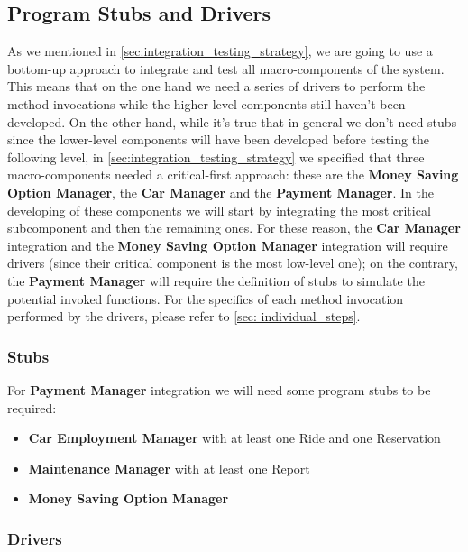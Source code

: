 	\subsection{Program Stubs and Drivers}
	
	As we mentioned in \autoref{sec:integration_testing_strategy}, we are going to use a bottom-up approach to integrate and test all macro-components of the system. This means that on the one hand we need a series of drivers to perform the method invocations while the higher-level components still haven't been developed. On the other hand, while it's true that in general we don't need stubs since the lower-level components will have been developed before testing the following level, in \autoref{sec:integration_testing_strategy} we specified that three macro-components needed a critical-first approach: these are the \textbf{Money Saving Option Manager}, the \textbf{Car Manager} and the \textbf{Payment Manager}. In the developing of these components we will start by integrating the most critical subcomponent and then the remaining ones. For these reason, the \textbf{Car Manager} integration and the \textbf{Money Saving Option Manager} integration will require drivers (since their critical component is the most low-level one); on the contrary, the \textbf{Payment Manager} will require the definition of stubs to simulate the potential invoked functions.
	For the specifics of each method invocation performed by the drivers, please refer to \autoref{sec: individual_steps}.
		
		\subsubsection{Stubs}
		\label{sec:stubs}
			For \textbf{Payment Manager} integration we will need some program stubs to be required:
			\begin{itemize}
				\item \textbf{Car Employment Manager} with at least one Ride and one Reservation 
				\item \textbf{Maintenance Manager} with at least one Report
				\item \textbf{Money Saving Option Manager}
			\end{itemize} 	
			
		
		
		\subsubsection{Drivers}
		\label{sec:drivers}

